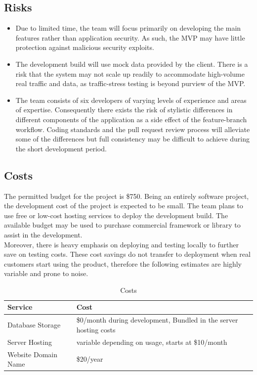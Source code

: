 \documentclass[12pt]{article}
\begin{document}
\subsection{Risks}
\begin{itemize}
    \item Due to limited time, the team will focus primarily on developing the 
    main features rather than application security. As such, the MVP may have 
    little protection against malicious security exploits.
    \item The development build will use mock data provided by the client. 
    There is a risk that the system may not scale up readily to accommodate 
    high-volume real traffic and data, as traffic-stress testing is beyond 
    purview of the MVP.
    \item The team consists of six developers of varying levels of experience 
    and areas of expertise. Consequently there exists the risk of stylistic 
    differences in different components of the application as a side effect of 
    the feature-branch workflow. Coding standards and the pull request review 
    process will alleviate some of the differences but full consistency may be 
    difficult to achieve during the short development period.
\end{itemize}

\subsection{Costs}

The permitted budget for the project is \$750. Being an entirely software 
project, the development cost of the project is expected to be small. The team 
plans to use free or low-cost hosting services to deploy the development build. 
The available budget may be used to purchase commercial framework or library to 
assist in the development.\\

Moreover, there is heavy emphasis on deploying and testing locally to further save on testing costs. These cost savings do not transfer to deployment when real customers start using the product, therefore the following estimates are highly variable and prone to noise.\\

\begin{table}
    \begin{tabularx}{\textwidth}{l X}
        \toprule
        \textbf{Service} & \textbf{Cost} \\
        \midrule
        Database Storage & \$0/month during development, Bundled in the server hosting costs\\
        Server Hosting & variable depending on usage, starts at \$10/month\\
        Website Domain Name & \$20/year\\
        \bottomrule
    \end{tabularx}
    \caption{Costs}
\end{table}
\end{document}
